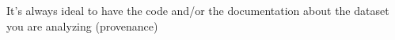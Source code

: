 \documentclass[a4paper,11pt,twoside]{article}
\begin{document}
It's always ideal to have the code and/or the documentation about the dataset you are analyzing (provenance)
 










\end{document}
